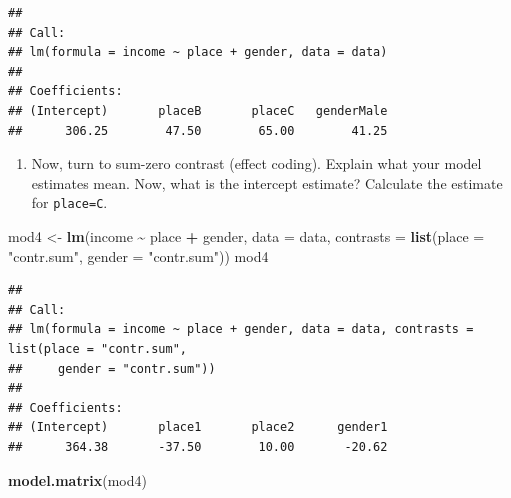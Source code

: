 \documentclass[
]{article}
\newenvironment{Shaded}{\begin{snugshade}}{\end{snugshade}}
\newcommand{\AttributeTok}[1]{\textcolor[rgb]{0.13,0.29,0.53}{#1}}
\newcommand{\FunctionTok}[1]{\textcolor[rgb]{0.13,0.29,0.53}{\textbf{#1}}}
\newcommand{\NormalTok}[1]{#1}
\newcommand{\OtherTok}[1]{\textcolor[rgb]{0.56,0.35,0.01}{#1}}
\newcommand{\SpecialCharTok}[1]{\textcolor[rgb]{0.81,0.36,0.00}{\textbf{#1}}}
\newcommand{\StringTok}[1]{\textcolor[rgb]{0.31,0.60,0.02}{#1}}
\providecommand{\tightlist}{%
  \setlength{\itemsep}{0pt}\setlength{\parskip}{0pt}}
\begin{document}
\begin{verbatim}
## 
## Call:
## lm(formula = income ~ place + gender, data = data)
## 
## Coefficients:
## (Intercept)       placeB       placeC   genderMale  
##      306.25        47.50        65.00        41.25
\end{verbatim}

\begin{enumerate}
\def\labelenumi{\arabic{enumi}.}
\setcounter{enumi}{4}
\tightlist
\item
  Now, turn to sum-zero contrast (effect coding). Explain what your
  model estimates mean. Now, what is the intercept estimate? Calculate
  the estimate for \texttt{place=C}.
\end{enumerate}

\begin{Shaded}
\begin{Highlighting}[]
\NormalTok{mod4 }\OtherTok{\textless{}{-}} \FunctionTok{lm}\NormalTok{(income }\SpecialCharTok{\textasciitilde{}}\NormalTok{ place }\SpecialCharTok{+}\NormalTok{ gender, }\AttributeTok{data =}\NormalTok{ data, }\AttributeTok{contrasts =} \FunctionTok{list}\NormalTok{(}\AttributeTok{place =} \StringTok{"contr.sum"}\NormalTok{,}
    \AttributeTok{gender =} \StringTok{"contr.sum"}\NormalTok{))}
\NormalTok{mod4}
\end{Highlighting}
\end{Shaded}

\begin{verbatim}
## 
## Call:
## lm(formula = income ~ place + gender, data = data, contrasts = list(place = "contr.sum", 
##     gender = "contr.sum"))
## 
## Coefficients:
## (Intercept)       place1       place2      gender1  
##      364.38       -37.50        10.00       -20.62
\end{verbatim}

\begin{Shaded}
\begin{Highlighting}[]
\FunctionTok{model.matrix}\NormalTok{(mod4)}
\end{Highlighting}
\end{Shaded}
\end{document}
